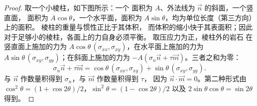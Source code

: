 \begin{proof}
取一个小棱柱，如下图所示：一个
面积为 $A$、外法线为 $\vec n$ 的斜面，一个竖直面，
面积为 $A\cos\theta$，一个水平面，面积为 $A\sin\theta$，均为单位长度（第三方向）上的面积。
棱柱的重量与惯性正比于其体积，
而体积的缩小快于其表面积；因此对于足够小的棱柱，各面上的力自身必须平衡。
取压应力为正，棱柱外的岩石
在竖直面上施加的力为
$A\cos\theta\,(\sigma_{xx}, \sigma_{xy})$，在水平面上施加的力为
$A\sin\theta\,(\sigma_{xy}, \sigma_{yy})$；在斜面上施加的力为
$-A(\sigma_n\vec n + \tau\vec m)$。三者之和为零：
\[
  \sigma_n\vec n + \tau\vec m = \cos\theta\,(\sigma_{xx}, \sigma_{xy}) + \sin\theta\,(\sigma_{xy}, \sigma_{yy}) .
\]
与 $\vec n$ 作数量积得到 $\sigma_n$，与 $\vec m$ 作数量积得到 $\tau$，
因为 $\vec n\cdot\vec m = 0$。第二种形式由
$\cos^2\theta = (1+\cos2\theta)/2$，$\sin^2\theta = (1-\cos2\theta)/2$ 以及
$2\sin\theta\cos\theta = \sin2\theta$ 得到。
\end{proof}

